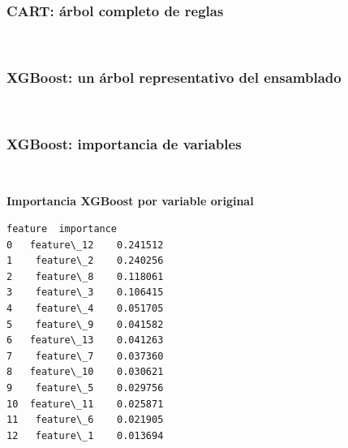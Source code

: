 \documentclass[11pt]{article}
\begin{document}
    \subsubsection{CART: árbol completo de
reglas}\label{cart-uxe1rbol-completo-de-reglas}

    
    \begin{center}
    \end{center}
    { \hspace*{\fill} \\}
    
    \subsubsection{XGBoost: un árbol representativo del
ensamblado}\label{xgboost-un-uxe1rbol-representativo-del-ensamblado}

    
    \begin{center}
    \end{center}
    { \hspace*{\fill} \\}
    
    \subsubsection{XGBoost: importancia de
variables}\label{xgboost-importancia-de-variables}

    
    \begin{center}
    \end{center}
    { \hspace*{\fill} \\}
    
    \textbf{Importancia XGBoost por variable original}

    
    
    \begin{Verbatim}[commandchars=\\\{\}]
       feature  importance
0   feature\_12    0.241512
1    feature\_2    0.240256
2    feature\_8    0.118061
3    feature\_3    0.106415
4    feature\_4    0.051705
5    feature\_9    0.041582
6   feature\_13    0.041263
7    feature\_7    0.037360
8   feature\_10    0.030621
9    feature\_5    0.029756
10  feature\_11    0.025871
11   feature\_6    0.021905
12   feature\_1    0.013694
    \end{Verbatim}
\end{document}
